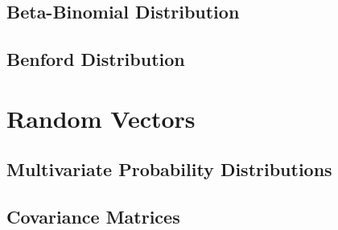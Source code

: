 \documentclass[11pt]{report} %
\begin{document}
\subsection{Beta-Binomial Distribution}

\subsection{Benford Distribution}

\section{Random Vectors}

\subsection{Multivariate Probability Distributions}

\subsection{Covariance Matrices}
\end{document}
